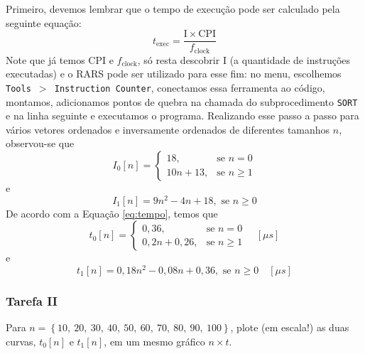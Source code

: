 \documentclass[a4paper,12pt]{article}
\newcommand{\cod}[1]{\texttt{#1}}
\begin{document}
Primeiro, devemos lembrar que o tempo de execução pode ser calculado pela seguinte equação:
\begin{equation}
    t_{\mathrm{exec}} =\frac{\mathrm{I} \times \mathrm{CPI}}{f_{\mathrm{clock}}} \label{eq:tempo}
\end{equation}
Note que já temos $\mathrm{CPI}$ e $f_{\mathrm{clock}}$, só resta descobrir $\mathrm{I}$ (a quantidade de instruções executadas) e o RARS pode ser utilizado para esse fim: no menu, escolhemos \cod{Tools $>$ Instruction Counter}, conectamos essa ferramenta ao código, montamos, adicionamos pontos de quebra na chamada do subprocedimento \cod{SORT} e na linha seguinte e executamos o programa. Realizando esse passo a passo para vários vetores ordenados e inversamente ordenados de diferentes tamanhos $n$, observou-se que
\[
    I_0[n] = \begin{cases}
        18, &\text{se } n = 0 \\
        10n + 13, &\text{se } n \geq 1
    \end{cases}
\]
e
\[
    I_1[n] = 9n^2 - 4n + 18, \text{ se } n \geq 0
\]
De acordo com a Equação \eqref{eq:tempo}, temos que
\begin{equation}
    t_0[n] = \begin{cases}
        0,36, &\text{se } n = 0 \\
        0,2n + 0,26, &\text{se } n \geq 1
    \end{cases}
    \quad \left[ \mu s\right] \label{eq:t0}
\end{equation}
e
\begin{equation}
    t_1[n] = 0,18 n^2 - 0,08n + 0,36, \text{ se } n \geq 0 \quad \left[ \mu s\right] \label{eq:t1}
\end{equation}

\subsubsection{Tarefa II}
\begin{tcolorbox}[title=Enunciado, colback=blue!5!white, colframe=blue!75!black]
Para $n = \left\{10,\ 20,\ 30,\ 40,\ 50,\ 60,\ 70,\ 80,\ 90,\ 100 \right\}$, plote (em escala!) as duas curvas, $t_0[n]$ e $t_1[n]$, em um mesmo gráfico $n \times t$.
\end{tcolorbox}
\end{document}

